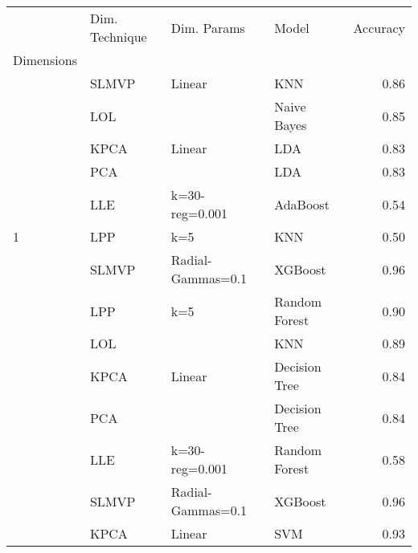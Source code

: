 \begin{table}
    \begin{tabular}{llllr}
        \toprule
        {}                                      & Dim. Technique & Dim. Params        & Model         & Accuracy \\
        Dimensions                              &                &                    &               &          \\
        \midrule
                                                & SLMVP          & Linear             & KNN           & 0.86     \\
                                                & LOL            &                    & Naive Bayes   & 0.85     \\
                                                & KPCA           & Linear             & LDA           & 0.83     \\
                                                & PCA            &                    & LDA           & 0.83     \\
                                                & LLE            & k=30-reg=0.001     & AdaBoost      & 0.54     \\
        \multirow{-6}{*}{1}                     & LPP            & k=5                & KNN           & 0.50     \\
        \rowcolor{lightgray}                    & SLMVP          & Radial-Gammas=0.1  & XGBoost       & 0.96     \\
        \rowcolor{lightgray}                    & LPP            & k=5                & Random Forest & 0.90     \\
        \rowcolor{lightgray}                    & LOL            &                    & KNN           & 0.89     \\
        \rowcolor{lightgray}                    & KPCA           & Linear             & Decision Tree & 0.84     \\
        \rowcolor{lightgray}                    & PCA            &                    & Decision Tree & 0.84     \\
        \rowcolor{lightgray}\multirow{-6}{*}{2} & LLE            & k=30-reg=0.001     & Random Forest & 0.58     \\
                                                & SLMVP          & Radial-Gammas=0.1  & XGBoost       & 0.96     \\
                                                & KPCA           & Linear             & SVM           & 0.93     \\

\end{tabular}
\end{table}
